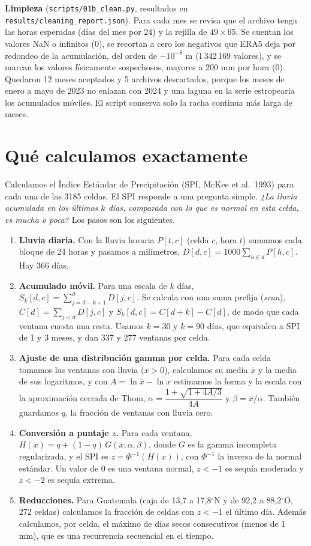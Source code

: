\documentclass[10pt]{article}
\begin{document}
\textbf{Limpieza} (\texttt{scripts/01b\_clean.py}, resultados en \texttt{results/cleaning\_report.json}). Para cada mes se revisa que el archivo tenga las horas esperadas (d\'ias del mes por 24) y la rejilla de $49\times65$. Se cuentan los valores NaN o infinitos (0), se recortan a cero los negativos que ERA5 deja por redondeo de la acumulaci\'on, del orden de $-10^{-8}$ m (1\,342\,169 valores), y se marcan los valores f\'isicamente sospechosos, mayores a 200 mm por hora (0). Quedaron 12 meses aceptados y 5 archivos descartados, porque los meses de enero a mayo de 2023 no enlazan con 2024 y una laguna en la serie estropear\'ia los acumulados m\'oviles. El script conserva solo la racha continua m\'as larga de meses.

\section{Qu\'e calculamos exactamente}
Calculamos el \'Indice Est\'andar de Precipitaci\'on (SPI, McKee et al.\ 1993) para cada una de las 3185 celdas. El SPI responde a una pregunta simple. \emph{¿La lluvia acumulada en los \'ultimos $k$ d\'ias, comparada con lo que es normal en esta celda, es mucha o poca?} Los pasos son los siguientes.
\begin{enumerate}
\item \textbf{Lluvia diaria.} Con la lluvia horaria $P[t,c]$ (celda $c$, hora $t$) sumamos cada bloque de 24 horas y pasamos a mil\'imetros, $D[d,c]=1000\sum_{h\in d}P[h,c]$. Hay 366 d\'ias.
\item \textbf{Acumulado m\'ovil.} Para una escala de $k$ d\'ias, $S_k[d,c]=\sum_{j=d-k+1}^{d}D[j,c]$. Se calcula con una suma prefija (\emph{scan}), $C[d]=\sum_{j<d}D[j,c]$ y $S_k[d,c]=C[d+k]-C[d]$, de modo que cada ventana cuesta una resta. Usamos $k=30$ y $k=90$ d\'ias, que equivalen a SPI de 1 y 3 meses, y dan 337 y 277 ventanas por celda.
\item \textbf{Ajuste de una distribuci\'on gamma por celda.} Para cada celda tomamos las ventanas con lluvia ($x>0$), calculamos su media $\bar x$ y la media de sus logaritmos, y con $A=\ln\bar x-\overline{\ln x}$ estimamos la forma y la escala con la aproximaci\'on cerrada de Thom, $\alpha=\dfrac{1+\sqrt{1+4A/3}}{4A}$ y $\beta=\bar x/\alpha$. Tambi\'en guardamos $q$, la fracci\'on de ventanas con lluvia cero.
\item \textbf{Conversi\'on a puntaje $z$.} Para cada ventana, $H(x)=q+(1-q)\,G(x;\alpha,\beta)$, donde $G$ es la gamma incompleta regularizada, y el SPI es $z=\Phi^{-1}(H(x))$, con $\Phi^{-1}$ la inversa de la normal est\'andar. Un valor de $0$ es una ventana normal, $z<-1$ es sequ\'ia moderada y $z<-2$ es sequ\'ia extrema.
\item \textbf{Reducciones.} Para Guatemala (caja de 13,7 a 17,8$^\circ$N y de 92,2 a 88,2$^\circ$O, 272 celdas) calculamos la fracci\'on de celdas con $z<-1$ el \'ultimo d\'ia. Adem\'as calculamos, por celda, el m\'aximo de d\'ias secos consecutivos (menos de 1 mm), que es una recurrencia secuencial en el tiempo.
\end{enumerate}
\end{document}
